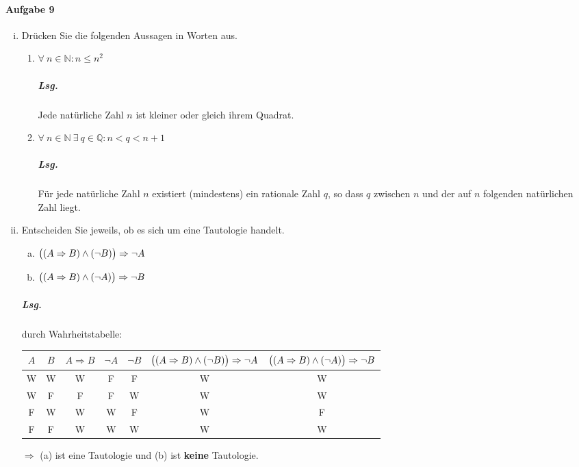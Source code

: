 \documentclass{scrreprt}
\begin{document}
\paragraph{Aufgabe 9}
\begin{enumerate}[(i)]
\item Drücken Sie die folgenden Aussagen in Worten aus.
  \begin{enumerate}[1)]
  \item $\forall \: n \in \mathbb{N} \colon n \leq n^2$

    \subparagraph{Lsg.} Jede natürliche Zahl $n$ ist kleiner oder gleich ihrem
    Quadrat.

  \item $\forall \: n \in \mathbb{N} \: \exists \: q \in \mathbb{Q} \colon n < q < n + 1$

    \subparagraph{Lsg.} Für jede natürliche Zahl $n$ existiert (mindestens) ein
    rationale Zahl $q$, so dass $q$ zwischen $n$ und der auf $n$ folgenden
    natürlichen Zahl liegt.
  \end{enumerate}

\item Entscheiden Sie jeweils, ob es sich um eine Tautologie handelt.
  \begin{enumerate}[(a)]
  \item $\qty\big(\qty(A \Rightarrow B) \land \qty(\neg B)) \Rightarrow \neg A$
  \item $\qty\big(\qty(A \Rightarrow B) \land \qty(\neg A)) \Rightarrow \neg B$
  \end{enumerate}

  \subparagraph{Lsg.} durch Wahrheitstabelle:
  \begin{center}
    \begin{tabular}{c | c | c | c | c | c | c}
      $A$ & $B$ & $A \Rightarrow B$ &$\neg A$ & $\neg B$ &
        $\qty\big((A \Rightarrow B) \land (\neg B)) \Rightarrow \neg A$ &
        $\qty\big((A \Rightarrow B) \land (\neg A)) \Rightarrow \neg B$ \\
      \hline
      W & W & W & F & F & W & W \\
      W & F & F & F & W & W & W \\
      F & W & W & W & F & W & F \\
      F & F & W & W & W & W & W
    \end{tabular}
  \end{center}
  $\Rightarrow$ (a) ist eine Tautologie und (b) ist \textbf{keine} Tautologie.
\end{enumerate}
\end{document}
